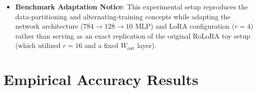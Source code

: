 \documentclass[10pt,a4paper]{article}
\begin{document}
\begin{itemize}
\begin{itemize}
        \item \textbf{FDA SMA (\texttt{NEW3FDA})}: Adaptive epoch schedule with Simple Moving Average ($W=3$ rounds) smoothed variance.
    \end{itemize}
    \item \textbf{Benchmark Adaptation Notice}: This experimental setup reproduces the data-partitioning and alternating-training concepts while adapting the network architecture ($784 \to 128 \to 10$ MLP) and LoRA configuration ($r=4$) rather than serving as an exact replication of the original RoLoRA toy setup (which utilized $r=16$ and a fixed $W_{\text{out}}$ layer).
\end{itemize}

\section{Empirical Accuracy Results}
\end{document}
